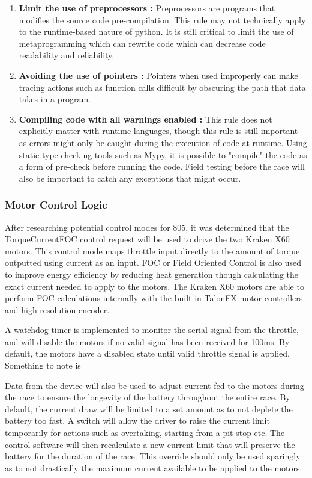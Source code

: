 \documentclass[12pt]{article}
\begin{document}
\begin{enumerate}
\item \textbf{Limit the use of preprocessors :} Preprocessors are programs that modifies the source code pre-compilation. This rule may not technically apply to the runtime-based nature of python. It is still critical to limit the use of metaprogramming which can rewrite code which can decrease code readability and reliability.
\item \textbf{Avoiding the use of pointers :} Pointers when used improperly can make tracing actions such as function calls difficult by obscuring the path that data takes in a program.
\item \textbf{Compiling code with all warnings enabled :} This rule does not explicitly matter with runtime languages, though this rule is still important as errors might only be caught during the execution of code at runtime. Using static type checking tools such as Mypy, it is possible to "compile" the code as a form of pre-check before running the code. Field testing before the race will also be important to catch any exceptions that might occur.
\end{enumerate}

\subsubsection{Motor Control Logic}
After researching potential control modes for 805, it was determined that the TorqueCurrentFOC control request will be used to drive the two Kraken X60 motors. This control mode maps throttle input directly to the amount of torque outputted using current as an input. FOC or Field Oriented Control is also used to improve energy efficiency by reducing heat generation though calculating the exact current needed to apply to the motors. The Kraken X60 motors are able to perform FOC calculations internally with the built-in TalonFX motor controllers and high-resolution encoder.

A watchdog timer is implemented to monitor the serial signal from the throttle, and will disable the motors if no valid signal has been received for 100ms. By default, the motors have a disabled state until valid throttle signal is applied. Something to note is 

Data from the device will also be used to adjust current fed to the motors during the race to ensure the longevity of the battery throughout the entire race. By default, the current draw will be limited to a set amount as to not deplete the battery too fast. A switch will allow the driver to raise the current limit temporarily for actions such as overtaking, starting from a pit stop etc. The control software will then recalculate a new current limit that will preserve the battery for the duration of the race. This override should only be used sparingly as to not drastically the maximum current available to be applied to the motors.
\end{document}
